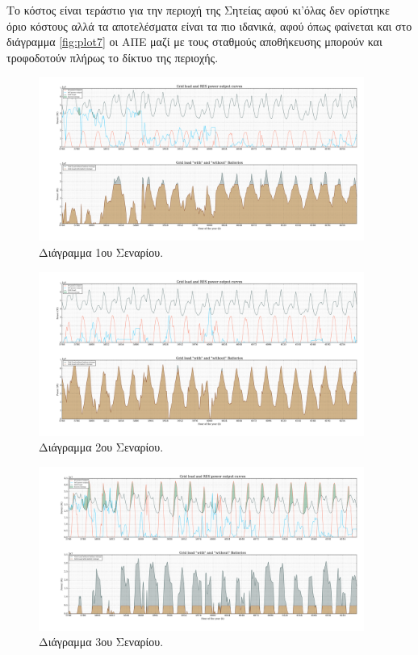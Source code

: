 \documentclass[12pt]{report}
\begin{document}
Το κόστος είναι τεράστιο για την περιοχή της Σητείας αφού κι'όλας δεν ορίστηκε όριο κόστους αλλά τα αποτελέσματα είναι τα πιο ιδανικά, αφού όπως φαίνεται και στο διάγραμμα \ref{fig:plot7} οι ΑΠΕ μαζί με τους σταθμούς αποθήκευσης
μπορούν και τροφοδοτούν πλήρως το δίκτυο της περιοχής.
\begin{figure}
				\center
				\includegraphics[width=0.95\textwidth]{scenarios/1/plot}
				\caption{Διάγραμμα 1ου Σεναρίου.}
				\label{fig:plot1}
\end{figure}

\begin{figure}
				\center
				\includegraphics[width=0.95\textwidth]{scenarios/2/plot}
				\caption{Διάγραμμα 2ου Σεναρίου.}
				\label{fig:plot2}
\end{figure}

\begin{figure}
				\center
				\includegraphics[width=0.95\textwidth]{scenarios/3/plot}
				\caption{Διάγραμμα 3ου Σεναρίου.}
				\label{fig:plot3}
\end{figure}
\end{document}
